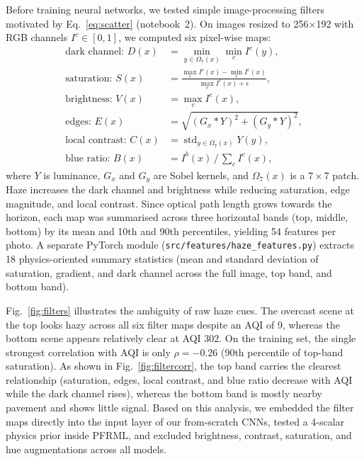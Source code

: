 \documentclass[conference]{IEEEtran}
\begin{document}
Before training neural networks, we tested simple image-processing filters
motivated by Eq.~\eqref{eq:scatter} (notebook~2). On images resized to
256$\times$192 with RGB channels $I^c \in[0,1]$, we computed six pixel-wise
maps:
\begin{align}
  \text{dark channel: } D(x)   & = \min_{y \in \Omega_7(x)} \min_{c} I^c(y), \label{eq:dcp}        \\
  \text{saturation: } S(x)     & = \frac{\max_c I^c(x) - \min_c I^c(x)}{\max_c I^c(x) + \epsilon}, \\
  \text{brightness: } V(x)     & = \max_c I^c(x),                                                  \\
  \text{edges: } E(x)          & = \sqrt{(G_x * Y)^2 + (G_y * Y)^2},                               \\
  \text{local contrast: } C(x) & = \operatorname{std}_{y \in \Omega_7(x)} Y(y),                    \\
  \text{blue ratio: } B(x)     & = I^b(x) \,/\, \textstyle\sum_c I^c(x),
\end{align}
where $Y$ is luminance, $G_x$ and $G_y$ are Sobel kernels, and $\Omega_7(x)$ is
a $7 \times 7$ patch. Haze increases the dark channel and brightness while
reducing saturation, edge magnitude, and local contrast. Since optical path
length grows towards the horizon, each map was summarised across three
horizontal bands (top, middle, bottom) by its mean and 10th and 90th
percentiles, yielding 54 features per photo. A separate PyTorch module
(\texttt{src/features/haze\_features.py}) extracts 18 physics-oriented summary
statistics (mean and standard deviation of saturation, gradient, and dark
channel across the full image, top band, and bottom band).

Fig.~\ref{fig:filters} illustrates the ambiguity of raw haze cues. The overcast
scene at the top looks hazy across all six filter maps despite an AQI of 9,
whereas the bottom scene appears relatively clear at AQI 302. On the training
set, the single strongest correlation with AQI is only $\rho = -0.26$ (90th
percentile of top-band saturation). As shown in Fig.~\ref{fig:filtercorr}, the
top band carries the clearest relationship (saturation, edges, local contrast,
and blue ratio decrease with AQI while the dark channel rises), whereas the
bottom band is mostly nearby pavement and shows little signal. Based on this
analysis, we embedded the filter maps directly into the input layer of our
from-scratch CNNs, tested a 4-scalar physics prior inside PFRML, and excluded
brightness, contrast, saturation, and hue augmentations across all models.
\end{document}
